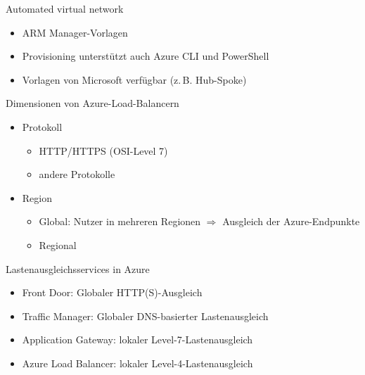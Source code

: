
\begin{flashcard}[]{Automated virtual network}
  \begin{itemize}
    \item ARM Manager-Vorlagen
    \item Provisioning unterstützt auch Azure CLI und PowerShell
    \item Vorlagen von Microsoft verfügbar (z.\,B. Hub-Spoke)
  \end{itemize}
\end{flashcard}


\begin{flashcard}[]{Dimensionen von Azure-Load-Balancern}
  \begin{itemize}
    \item Protokoll
      \begin{itemize}
        \item HTTP/HTTPS (OSI-Level 7)
        \item andere Protokolle
      \end{itemize}
    \item Region
      \begin{itemize}
        \item Global: Nutzer in mehreren Regionen\newline
          $\Rightarrow$ Ausgleich der Azure-Endpunkte
        \item Regional
      \end{itemize}
  \end{itemize}
\end{flashcard}

\begin{flashcard}[]{Lastenausgleichsservices in Azure}
  \begin{itemize}
    \item Front Door: Globaler HTTP(S)-Ausgleich
    \item Traffic Manager: Globaler DNS-basierter Lastenausgleich
    \item Application Gateway: lokaler Level-7-Lastenausgleich
    \item Azure Load Balancer: lokaler Level-4-Lastenausgleich
  \end{itemize}
\end{flashcard}


